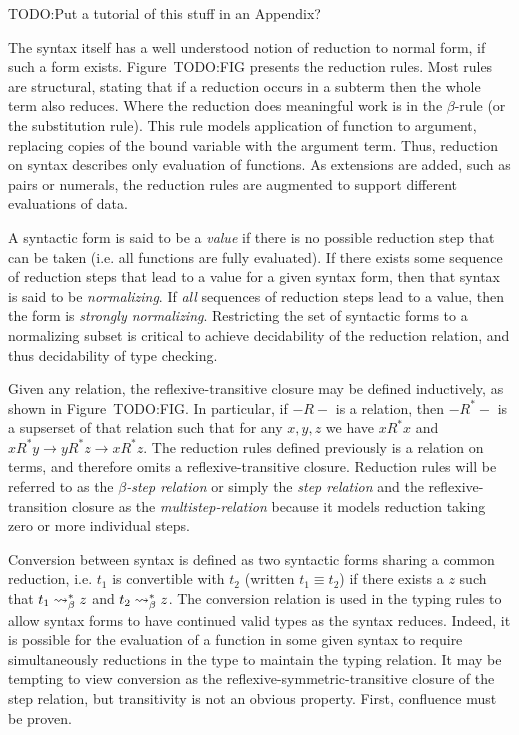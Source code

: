 TODO:Put a tutorial of this stuff in an Appendix?

The syntax itself has a well understood notion of reduction to normal form, if such a form exists.
Figure~TODO:FIG presents the reduction rules.
Most rules are structural, stating that if a reduction occurs in a subterm then the whole term also reduces.
Where the reduction does meaningful work is in the $\beta$-rule (or the substitution rule).
This rule models application of function to argument, replacing copies of the bound variable with the argument term.
Thus, reduction on syntax describes only evaluation of functions.
As extensions are added, such as pairs or numerals, the reduction rules are augmented to support different evaluations of data.

A syntactic form is said to be a \textit{value} if there is no possible reduction step that can be taken (i.e. all functions are fully evaluated).
If there exists some sequence of reduction steps that lead to a value for a given syntax form, then that syntax is said to be \textit{normalizing}.
If \textit{all} sequences of reduction steps lead to a value, then the form is \textit{strongly normalizing}.
Restricting the set of syntactic forms to a normalizing subset is critical to achieve decidability of the reduction relation, and thus decidability of type checking.

Given any relation, the reflexive-transitive closure may be defined inductively, as shown in Figure~TODO:FIG.
In particular, if $-R-$ is a relation, then $-R^*-$ is a supserset of that relation such that for any $x, y, z$ we have $x R^* x$ and $x R^* y \to y R^* z \to x R^* z$.
The reduction rules defined previously is a relation on terms, and therefore omits a reflexive-transitive closure.
Reduction rules will be referred to as the $\beta$\textit{-step relation} or simply the \textit{step relation} and the reflexive-transition closure as the \textit{multistep-relation} because it models reduction taking zero or more individual steps.

Conversion between syntax is defined as two syntactic forms sharing a common reduction, i.e. $t_1$ is convertible with $t_2$ (written $t_1 \equiv t_2$) if there exists a $z$ such that $t_1 \rightsquigarrow_\beta^* z$ and $t_2 \rightsquigarrow_\beta^* z$.
The conversion relation is used in the typing rules to allow syntax forms to have continued valid types as the syntax reduces.
Indeed, it is possible for the evaluation of a function in some given syntax to require simultaneously reductions in the type to maintain the typing relation.
It may be tempting to view conversion as the reflexive-symmetric-transitive closure of the step relation, but transitivity is not an obvious property.
First, confluence must be proven.

